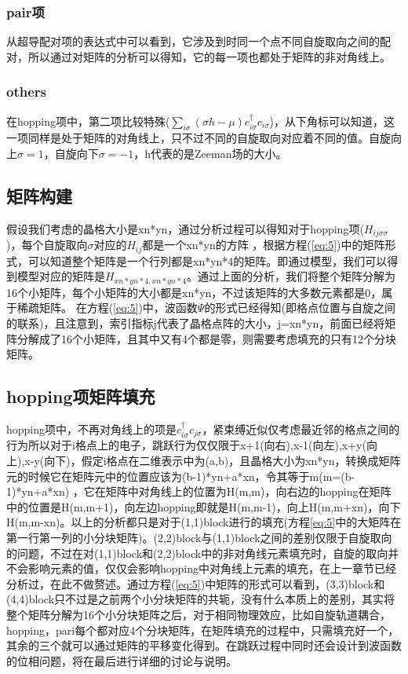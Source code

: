 \documentclass[a4paper,12pt]{ctexart}
\numberwithin{equation}{section}
\begin{document}
\subsubsection{pair项}
从超导配对项的表达式中可以看到，它涉及到时同一个点不同自旋取向之间的配对，所以通过对矩阵的分析可以得知，它的每一项也都处于矩阵的非对角线上。
\subsubsection{others}
在hopping项中，第二项比较特殊($\sum_{i\sigma}(\sigma h-\mu)c_{i\sigma}^\dagger c_{i\sigma}$)，从下角标可以知道，这一项同样是处于矩阵的对角线上，只不过不同的自旋取向对应着不同的值。自旋向上$\sigma=1$，自旋向下$\sigma=-1$，h代表的是Zeeman场的大小。
\subsection{矩阵构建}
假设我们考虑的晶格大小是xn*yn，通过分析过程可以得知对于hopping项($H_{ij\sigma\sigma}$)，每个自旋取向$\sigma$对应的$H_{ij}$都是一个xn*yn的方阵
，根据方程(\ref{eq:5})中的矩阵形式，可以知道整个矩阵是一个行列都是xn*yn*4的矩阵。即通过模型，我们可以得到模型对应的矩阵是$H_{xn*yn*4,xn*yn*4}$。通过上面的分析，我们将整个矩阵分解为16个小矩阵，每个小矩阵的大小都是xn*yn，不过该矩阵的大多数元素都是0，属于稀疏矩阵。
在方程(\ref{eq:5})中，波函数$\Psi$的形式已经得知(即格点位置与自旋之间的联系)，且注意到，索引指标j代表了晶格点阵的大小，j=xn*yn，前面已经将矩阵分解成了16个小矩阵，且其中又有4个都是零，则需要考虑填充的只有12个分块矩阵。
\subsection{hopping项矩阵填充}
hopping项中，不再对角线上的项是$c_{i\sigma}^\dagger c_{j\sigma}$，紧束缚近似仅考虑最近邻的格点之间的行为所以对于i格点上的电子，跳跃行为仅仅限于x+1(向右),x-1(向左),x+y(向上),x-y(向下)，假定i格点在二维表示中为(a,b)，且晶格大小为xn*yn，转换成矩阵元的时候它在矩阵元中的位置应该为(b-1)*yn+a*xn，令其等于m(m=(b-1)*yn+a*xn)
，它在矩阵中对角线上的位置为H(m,m)，向右边的hopping在矩阵中的位置是H(m,m+1)，向左边hopping即就是H(m,m-1)，向上H(m,m+xn)，向下H(m,m-xn)。以上的分析都只是对于(1,1)block进行的填充(方程\ref{eq:5}中的大矩阵在第一行第一列的小分块矩阵)。(2,2)block与(1,1)block之间的差别仅限于自旋取向的问题，不过在对(1,1)block和(2,2)block中的非对角线元素填充时，自旋的取向并不会影响元素的值，仅仅会影响hopping中对角线上元素的填充，在上一章节已经分析过，在此不做赘述。通过方程(\ref{eq:5})中矩阵的形式可以看到，(3,3)block和(4,4)block只不过是之前两个小分块矩阵的共轭，没有什么本质上的差别，其实将整个矩阵分解为16个小分块矩阵之后，对于相同物理效应，比如自旋轨道耦合，hopping，pari每个都对应4个分块矩阵，在矩阵填充的过程中，只需填充好一个，其余的三个就可以通过矩阵的平移变化得到。在跳跃过程中同时还会设计到波函数的位相问题，将在最后进行详细的讨论与说明。
\end{document}
